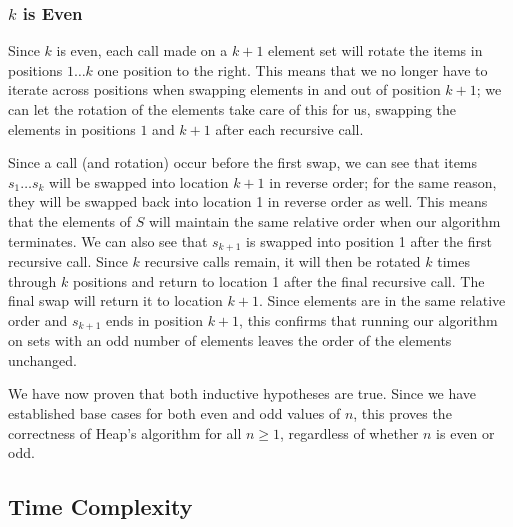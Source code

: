 \documentclass[10pt, oneside]{article}   	%
\begin{document}
\subsubsection{$k$ is Even}

Since $k$ is even, each call made on a $k + 1$ element set will rotate the items in positions $1 \dots k$ one position to the right. This means that we no longer have to iterate across positions when swapping elements in and out of position $k + 1$; we can let the rotation of the elements take care of this for us, swapping the elements in positions $1$ and $k + 1$ after each recursive call.

Since a call (and rotation) occur before the first swap, we can see that items $s_{1} \dots s_{k}$ will be swapped into location $k + 1$ in reverse order; for the same reason, they will be swapped back into location 1 in reverse order as well. This means that the elements of $S$ will maintain the same relative order when our algorithm terminates. We can also see that $s_{k + 1}$ is swapped into position 1 after the first recursive call. Since $k$ recursive calls remain, it will then be rotated $k$ times through $k$ positions and return to location 1 after the final recursive call. The final swap will return it to location $k + 1$. Since elements are in the same relative order and $s_{k + 1}$ ends in position $k + 1$, this confirms that running our algorithm on sets with an odd number of elements leaves the order of the elements unchanged.

We have now proven that both inductive hypotheses are true. Since we have established base cases for both even and odd values of $n$, this proves the correctness of Heap's algorithm for all $n \geq 1$, regardless of whether $n$ is even or odd.

\subsection{Time Complexity}
\end{document}
